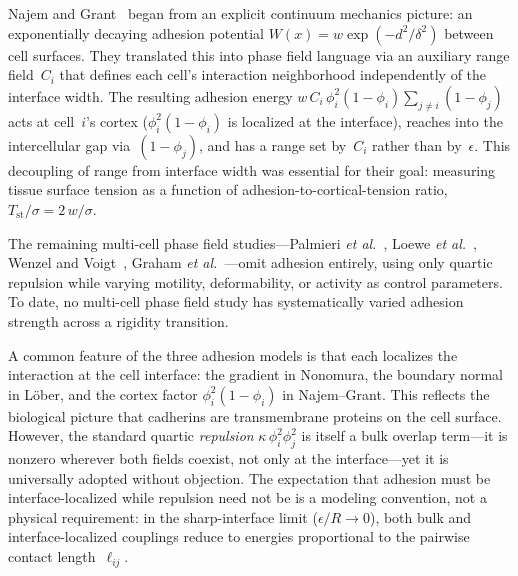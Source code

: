\documentclass[aps,pre,twocolumn,superscriptaddress,longbibliography]{revtex4-2}
\newcommand{\phii}{\phi_i}                 %
\newcommand{\phij}{\phi_j}                 %
\begin{document}
Najem and Grant~\cite{Najem2016} began from an explicit continuum
mechanics picture: an exponentially decaying adhesion potential
$W(x) = w\exp(-d^2/\delta^2)$ between cell surfaces.  They translated
this into phase field language via an auxiliary range field~$C_i$ that
defines each cell's interaction neighborhood independently of the
interface width.  The resulting adhesion energy
$w\,C_i\,\phii^2(1 - \phii)\sum_{j\neq i}(1 - \phij)$
acts at cell~$i$'s cortex ($\phii^2(1-\phii)$ is localized at the
interface), reaches into the intercellular gap via~$(1 - \phij)$, and has a
range set by~$C_i$ rather than by~$\epsilon$.  This decoupling of range
from interface width was essential for their goal: measuring tissue surface
tension as a function of adhesion-to-cortical-tension ratio,
$T_{\mathrm{st}}/\sigma = 2\,w/\sigma$.

The remaining multi-cell phase field studies---Palmieri
\textit{et al.}~\cite{Palmieri2015},
Loewe \textit{et al.}~\cite{Loewe2020},
Wenzel and Voigt~\cite{Wenzel2021},
Graham \textit{et al.}~\cite{Graham2024}---omit adhesion entirely,
using only quartic repulsion while varying motility, deformability,
or activity as control parameters.  To date, no multi-cell phase field
study has systematically varied adhesion strength across a rigidity
transition.

A common feature of the three adhesion models is that each localizes the
interaction at the cell interface: the gradient in Nonomura, the boundary
normal in L\"ober, and the cortex factor
$\phii^2(1 - \phii)$ in Najem--Grant.  This reflects the biological
picture that cadherins are transmembrane proteins on the cell surface.
However, the standard quartic \emph{repulsion}
$\kappa\,\phii^2\phij^2$ is itself a bulk overlap term---it is
nonzero wherever both fields coexist, not only at the interface---yet
it is universally adopted without objection.  The expectation that
adhesion must be interface-localized while repulsion need not be
is a modeling convention, not a physical requirement: in the
sharp-interface limit ($\epsilon/R \to 0$), both bulk and
interface-localized couplings reduce to energies proportional to the
pairwise contact length~$\ell_{ij}$.
\end{document}
